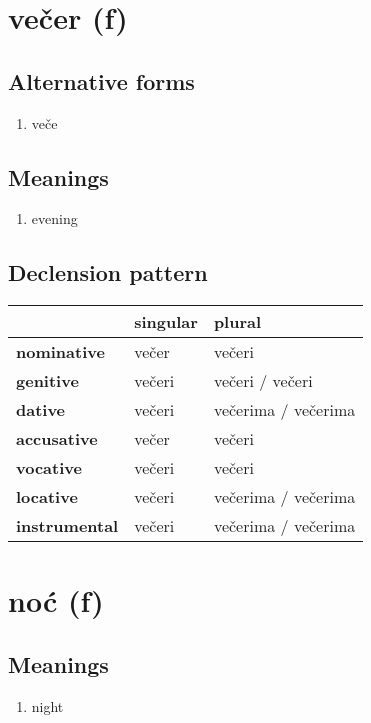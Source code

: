 \filbreak
\section{večer (f)}
\subsection*{Alternative forms}
\begin{enumerate}
\item veče
\end{enumerate}
\subsection*{Meanings}
\begin{enumerate}
\item evening
\end{enumerate}
\subsection*{Declension pattern}
\begin{tabularx}{\linewidth}{Xll}
\toprule
{} & singular &               plural \\
\midrule
\textbf{nominative  } &    večer &               večeri \\
\textbf{genitive    } &   večeri &      večeri / večeri \\
\textbf{dative      } &   večeri &  večerima / večerima \\
\textbf{accusative  } &    večer &               večeri \\
\textbf{vocative    } &   večeri &               večeri \\
\textbf{locative    } &   večeri &  večerima / večerima \\
\textbf{instrumental} &   večeri &  večerima / večerima \\
\bottomrule
\end{tabularx}

\filbreak
\section{noć (f)}
\subsection*{Meanings}
\begin{enumerate}
\item night
\end{enumerate}
